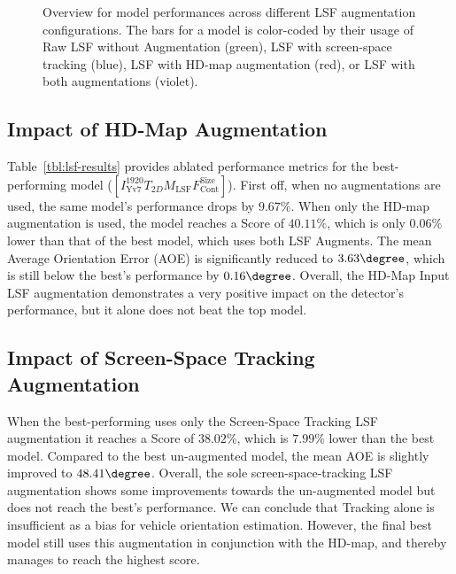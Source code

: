 \begin{figure}[htb]
    
    \caption{Overview for model performances across different LSF augmentation configurations. The bars for a model is color-coded by their usage of Raw LSF without Augmentation (green), LSF with screen-space tracking (blue), LSF with HD-map augmentation (red), or LSF with both augmentations (violet). }
    \label{fig:lsf-augmentations-overview}
\end{figure}

\subsection{Impact of HD-Map Augmentation}
\label{subsec:impactmap}

Table~\ref{tbl:lsf-results} provides ablated performance metrics for the best-performing model ($\left[I^{1920}_\text{Yv7}T_{2D}M_\text{LSF}F_\text{Cont}^\text{Size}\right]$). First off, when no augmentations are used, the same model's performance drops by $9.67\%$.
When only the HD-map augmentation is used, the model reaches a Score of $40.11\%$, which is only $0.06\%$ lower than that of the best model, which uses both LSF Augments.
The mean Average Orientation Error (AOE) is significantly reduced to $3.63\degree$, which is still below the best's performance by $0.16\degree$.
Overall, the HD-Map Input LSF augmentation demonstrates a very positive impact on the detector's performance, but it alone does not beat the top model.

\subsection{Impact of Screen-Space Tracking Augmentation}
\label{subsec:impactlsf}

When the best-performing uses only the Screen-Space Tracking LSF augmentation it reaches a Score of $38.02\%$, which is $7.99\%$ lower than the best model.
Compared to the best un-augmented model, the mean AOE is slightly improved to $48.41\degree$.
Overall, the sole screen-space-tracking LSF augmentation shows some improvements towards the un-augmented model but does not reach the best's performance.
We can conclude that Tracking alone is insufficient as a bias for vehicle orientation estimation.
However, the final best model still uses this augmentation in conjunction with the HD-map, and thereby manages to reach the highest score.


